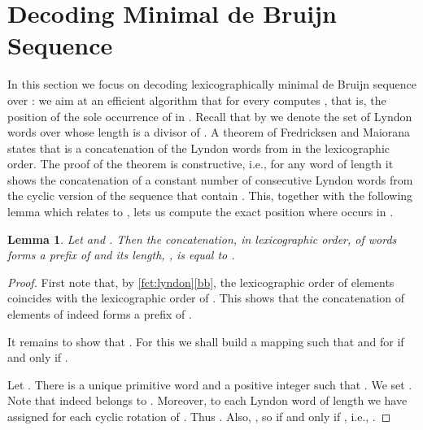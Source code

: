 \documentclass{article}
\newcommand{\mayqed}{}
\newtheorem{lemma}[theorem]{Lemma}
\theoremstyle{definition}
\theoremstyle{remark}
\begin{document}
\section{Decoding Minimal de Bruijn Sequence}\label{sec:debruijn}
In this section we focus on decoding lexicographically minimal de Bruijn sequence  over :
we aim at an efficient algorithm that for every  computes , that is,
the position of the sole occurrence of  in .
Recall that by  we denote the set of Lyndon words over  whose length is a divisor of .
A theorem of Fredricksen and Maiorana \cite{DBLP:journals/jct/Fredricksen70,fredricksen1978necklaces,Knuth}
states that  is a concatenation of the Lyndon words from 
in the lexicographic order.
The proof of the theorem is constructive,
i.e., for any word  of length  it shows the concatenation of
a constant number of consecutive Lyndon words from the cyclic version of the sequence  that contain .
This, together with the following lemma which relates  to , lets us compute the
exact position where  occurs in .

\begin{lemma}\label{lem:db}
  Let  and .
  Then the concatenation, in lexicographic order, of words 
  forms a prefix of  and its length, , is equal
  to .
\end{lemma}
\begin{proof}
  First note that, by \cref{fct:lyndon}\ref{bb}, the lexicographic order of elements 
  coincides with the lexicographic order of .
  This shows that the concatenation of elements of  indeed forms a prefix of .


  It remains to show that .
  For this we shall build a mapping 
  such that  and  for  if and only if .

  Let . There is a unique primitive word  and a positive integer  such that .
  We set .
  Note that  indeed belongs to .
  Moreover, to each Lyndon word
   of length  we have assigned  for each cyclic rotation  of .
  Thus .
  Also, , so  if and only if ,
  i.e., .
\mayqed\end{proof}
\end{document}
